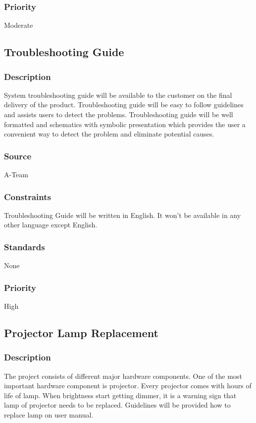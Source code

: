 \subsubsection{Priority}
Moderate

\subsection{Troubleshooting Guide}
\subsubsection{Description}
System troubleshooting guide will be available to the customer on the final delivery of the product. Troubleshooting guide will be easy to follow guidelines and assists users to detect the problems. Troubleshooting guide will be well formatted and schematics with symbolic presentation which provides the user a convenient way to detect the problem and eliminate potential causes.
\subsubsection{Source}
A-Team 
\subsubsection{Constraints}
Troubleshooting Guide will be written in English. It won't be available in any other language except English. 
\subsubsection{Standards}
None
\subsubsection{Priority}
High

\subsection{Projector Lamp Replacement}
\subsubsection{Description}
The project consists of different major hardware components. One of the most important hardware component is projector. Every projector comes with hours of life of lamp. When brightness start getting dimmer, it is a warning sign that lamp of projector needs to be replaced. Guidelines will be provided how to replace lamp on user manual. 
